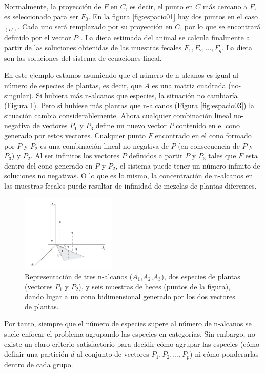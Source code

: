 Normalmente, la proyección de $F$ en $C$, es decir, el punto en $C$ más cercano a $F$, es seleccionado para ser $F_0$. En la figura \ref{fig:espacio01} hay dos puntos en el caso $_{(II)}$. Cada uno será remplazado por su proyección en $C$, por lo que se encontrará definido por el vector $P_1$.
La dieta estimada del animal se calcula finalmente a partir de las soluciones obtenidas de las muestras fecales $F_1,F_2,...,F_q$.
La dieta son las soluciones del sistema de ecuaciones lineal.

En este ejemplo estamos asumiendo que el número de n-alcanos es igual al número de especies de plantas, es decir, que $A$ es una matriz cuadrada (no-singular). Si hubiera más n-alcanos que especies, la situación no cambiaría (Figura \ref{fig:espacio02}). Pero si hubiese más plantas que n-alcanos (Figura \ref{fig:espacio03}) la situación cambia considerablemente. Ahora cualquier combinación lineal no-negativa de vectores $P_1$ y $P_3$ define un nuevo vector $P$ contenido en el cono generado por estos vectores. Cualquier punto $F$ encontrado en el cono formado por $P$ y $P_2$ es una combinación lineal no negativa de $P$ (en consecuencia de $P$ y $P_3$) y $P_2$. Al ser infinitos los vectores $P$ definidos a partir $P$ y $P_3$ tales que $F$ esta dentro del cono generado en $P$ y $P_2$, el sistema puede tener un número infinito de soluciones no negativas. O lo que es lo mismo, la concentración de n-alcanos en las muestras fecales puede resultar de infinidad de mezclas de plantas diferentes.

\begin{figure}[h!] 
\centering
    \includegraphics[width=0.4\textwidth]{img/espacio02.png}
\caption{Representación de tres n-alcanos ($A_1$,$A_2$,$A_3$), dos especies de plantas (vectores $P_1$ y $P_2$), y seis muestras de heces (puntos de la figura), dando lugar a un cono bidimensional generado por los dos vectores de plantas.}
\label{fig:espacio02}
\end{figure}

Por tanto, siempre que el número de especies supere al número de n-alcanos se suele enfocar el problema agrupando las especies en categorías. Sin embargo, no existe un claro criterio satisfactorio para decidir cómo agrupar las especies (cómo definir una partición $d$ al conjunto de vectores $P_1, P_2,...,P_p$) ni cómo ponderarlas dentro de cada grupo.

